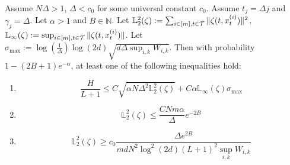 \begin{lemma}\label{lemma:conditional_concentration}
Assume $N\Delta > 1$, $\Delta < c_0$ for some universal constant $c_0$.  Assume $t_j = \Delta j$ and $\gamma_{j} = \Delta$. Let $\alpha > 1$ and $B \in \mathbb{N}$. Let $\mathbb{L}_2^2(\zeta) := \sum_{i\in[m],t\in\mathcal{T}}\|\zeta(t,x^{(i)}_{t})\|^2$, $\mathbb{L}_{\infty}(\zeta) := \sup_{i\in[m],t\in\mathcal{T}}\|\zeta(t,x_{t}^{(i)})\|$. Let $\sigma_{\max} := \log(\tfrac{1}{\Delta})\log(2d)\sqrt{d\Delta\sup_{i,k}W_{i,k}}$. Then with probability $1-(2B+1)e^{-\alpha}$, at least one of the following inequalities hold:

    \begin{enumerate}
        \item $$\frac{H}{L+1} \leq C\sqrt{\alpha N\Delta^2 \mathbb{L}_2^2(\zeta)}+C\alpha\mathbb{L}_{\infty}(\zeta)\sigma_{\max}$$
        \item $$\mathbb{L}_2^2(\zeta) \leq \frac{CNm\alpha}{\Delta}e^{-2B}$$
        \item $$\mathbb{L}_2^2(\zeta)\geq c_0\frac{\Delta e^{2B}}{md N^2 \log^2(2d)(L+1)^2\sup_{i,k}W_{i,k}}$$
    \end{enumerate}
\end{lemma}

